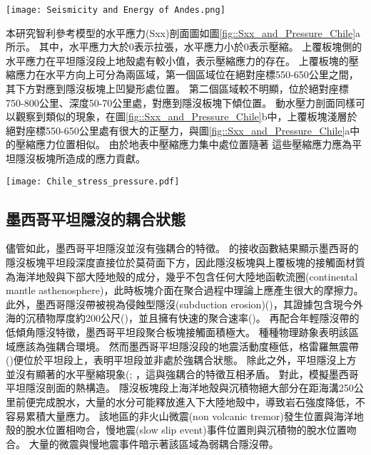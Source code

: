 \begin{figure*}[htp]
    \centering
    \texttt{[image: Seismicity and Energy of Andes.png]}
    \caption[智利沿岸自21$^\circ$S到44$^\circ$S的上板塊地震活動統計分析，摘自\citealp{gutscher2002andean}]{智利沿岸自20$^\circ$S到40$^\circ$S的上板塊地震活動統計分析，摘自\citealp{gutscher2002andean}。這裡採用深度<70公里的地震事件總能量，單位為10$^6$焦耳。右側數字表示1900-1963年/1964-1995年間所示分的第鎮能量。數字下灰色底框標示出平坦隱沒段的位置。
    }
    \label{fig::Chile_seismicity}
\end{figure*}

本研究智利參考模型的水平應力(Sxx)剖面圖如圖\ref{fig::Sxx_and_Pressure_Chile}a所示。
其中，水平應力大於0表示拉張，水平應力小於0表示壓縮。
上覆板塊側的水平應力在平坦隱沒段上地殼處有較小值，表示壓縮應力的存在。
上覆板塊的壓縮應力在水平方向上可分為兩區域，第一個區域位在絕對座標550-650公里之間，其下方對應到隱沒板塊上凹變形處位置。
第二個區域較不明顯，位於絕對座標750-800公里、深度50-70公里處，對應到隱沒板塊下傾位置。
動水壓力剖面同樣可以觀察到類似的現象，在圖\ref{fig::Sxx_and_Pressure_Chile}b中，上覆板塊淺層於絕對座標550-650公里處有很大的正壓力，與圖\ref{fig::Sxx_and_Pressure_Chile}a中的壓縮應力位置相似。
由於地表中壓縮應力集中處位置隨著
這些壓縮應力應為平坦隱沒板塊所造成的應力貢獻。


\begin{figure*}[h]
    \centering
    \texttt{[image: Chile\_stress\_pressure.pdf]}
    \caption[參考模型於15-40 Myr的水平軸差應力與動水壓力剖面]{參考模型於15-40 Myr的水平軸差應力與動水壓力剖面，其中應力。}
    \label{fig::Sxx_and_Pressure_Chile}
\end{figure*}
\subsection{墨西哥平坦隱沒的耦合狀態}
儘管如此，墨西哥平坦隱沒並沒有強耦合的特徵。
\citealp{PerezCampos2008}的接收函數結果顯示墨西哥的隱沒板塊平坦段深度直接位於莫荷面下方，因此隱沒板塊與上覆板塊的接觸面材質為海洋地殼與下部大陸地殼的成分，幾乎不包含任何大陸地函軟流圈(continental mantle asthenosphere)，此時板塊介面在聚合過程中理論上應產生很大的摩擦力。
此外，墨西哥隱沒帶被視為侵蝕型隱沒(subduction erosion)(\citealp{stern2011subduction})，其證據包含現今外海的沉積物厚度約200公尺(\citealp{manea2003sediment})，並且擁有快速的聚合速率(\citealp{o2005uncertainties})。
再配合年輕隱沒帶的低傾角隱沒特徵，墨西哥平坦段聚合板塊接觸面積極大。
種種物理跡象表明該區域應該為強耦合環境。
然而墨西哥平坦隱沒段的地震活動度極低，格雷羅無震帶(\citealp{kostoglodov2003large})便位於平坦段上，表明平坦段並非處於強耦合狀態。
除此之外，平坦隱沒上方並沒有顯著的水平壓縮現象(\citealp{nieto2006latest}; \citealp{moran2007cenozoic}，這與強耦合的特徵互相矛盾。
對此，\citealp{Manea2011Thermal}模擬墨西哥平坦隱沒剖面的熱構造。
隱沒板塊段上海洋地殼與沉積物絕大部分在距海溝250公里前便完成脫水，大量的水分可能釋放進入下大陸地殼中，導致岩石強度降低，不容易累積大量應力。
該地區的非火山微震(non volcanic tremor)發生位置與海洋地殼的脫水位置相吻合\citealp{Manea2011Thermal}，慢地震(slow slip event)事件位置則與沉積物的脫水位置吻合\citealp{Song2009}。
大量的微震與慢地震事件暗示著該區域為弱耦合隱沒帶。

